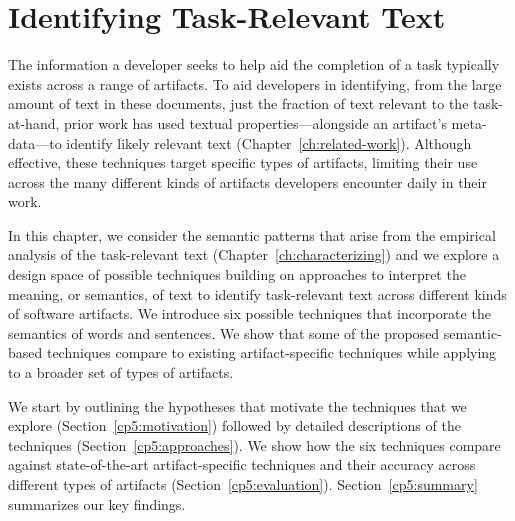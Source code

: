 \setcounter{chapter}{4}


\chapter{Identifying Task-Relevant Text}
\label{ch:identifying}

The information a developer seeks to help aid the completion of a task typically exists
across a range of artifacts. 
To aid developers in identifying, from the large amount of text
in these documents, just the fraction of text relevant
to the task-at-hand, prior work has used textual properties---alongside an artifact's meta-data---to
 identify likely relevant text (Chapter~\ref{ch:related-work}).
Although effective, these techniques target specific
types of artifacts, limiting their use across the 
many different kinds of artifacts developers encounter
daily in their work.



In this chapter, we consider the 
semantic patterns that arise from the empirical analysis of the task-relevant text (Chapter~\ref{ch:characterizing})
and we explore a design space of possible techniques building on approaches to interpret the meaning, or semantics, of text
to identify task-relevant text across different kinds of software artifacts.
We introduce six possible techniques that incorporate the  
semantics of words and sentences. 
We show that some of the proposed semantic-based techniques 
compare to existing artifact-specific techniques 
while applying to a broader set of types of artifacts.





We start by outlining the hypotheses that motivate the techniques that we explore (Section~\ref{cp5:motivation}) followed by detailed descriptions of the
techniques (Section~\ref{cp5:approaches}).
We show how the six techniques 
compare against state-of-the-art artifact-specific techniques and 
their accuracy across different types of artifacts (Section~\ref{cp5:evaluation}). 
Section~\ref{cp5:summary} summarizes our key findings.

\clearpage










